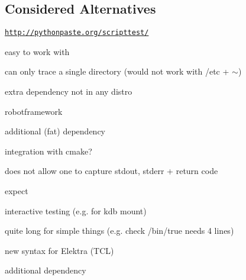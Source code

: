 \subsection*{Considered Alternatives}


\begin{DoxyItemize}
\item \href{http://pythonpaste.org/scripttest/}{\tt http\+://pythonpaste.\+org/scripttest/}
\begin{DoxyItemize}
\item easy to work with
\item can only trace a single directory (would not work with /etc + $\sim$)
\item extra dependency not in any distro
\end{DoxyItemize}
\item robotframework
\begin{DoxyItemize}
\item additional (fat) dependency
\item integration with cmake?
\item does not allow one to capture stdout, stderr + return code
\end{DoxyItemize}
\item expect
\begin{DoxyItemize}
\item interactive testing (e.\+g. for kdb mount)
\item quite long for simple things (e.\+g. check /bin/true needs 4 lines)
\item new syntax for Elektra (T\+C\+L)
\item additional dependency 
\end{DoxyItemize}
\end{DoxyItemize}